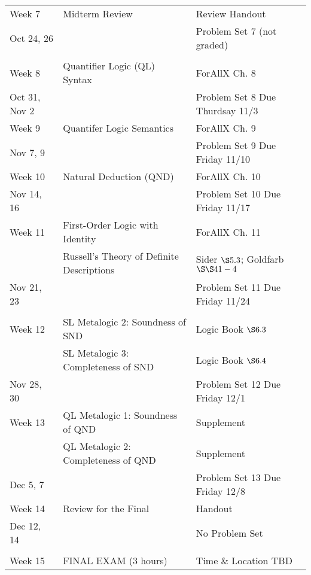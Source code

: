 \documentclass[letterpaper]{inzane_syllabus} %
\begin{document}
\begin{center}
\begin{tabularx}{\textwidth}{p{2.5cm}p{8cm}p{9cm}}
Week 7 & Midterm Review & Review Handout \\
Oct 24, 26 & &  Problem Set 7 (not graded) \\
\arrayrulecolor{myCOLOR}\hline

\multicolumn{2}{l}{\textbf{\textcolor{myCOLOR}{\large Part 2: Quantifer Logic (QL) }}} \\
\hline

Week 8 & Quantifier Logic (QL) Syntax & ForAllX Ch. 8 \\
Oct 31, Nov 2 & & Problem Set 8 Due Thurdsay 11/3 \\
\arrayrulecolor{maingray}\hline
 
Week 9 & Quantifer Logic Semantics & ForAllX Ch. 9 \\
Nov 7, 9 & & Problem Set 9 Due Friday 11/10 \\
\arrayrulecolor{maingray}\hline

Week 10 & Natural Deduction (QND) & ForAllX Ch. 10 \\
Nov 14, 16 & & Problem Set 10 Due Friday 11/17 \\
\arrayrulecolor{maingray}\hline

Week 11 & First-Order Logic with Identity & ForAllX Ch. 11 \\
& Russell's Theory of Definite Descriptions & Sider $\S 5.3$; Goldfarb $\S\S 41-4$ \\
Nov 21, 23 & & Problem Set 11 Due Friday 11/24 \\
\arrayrulecolor{maingray}\hline

\multicolumn{2}{l}{\textbf{\textcolor{myCOLOR}{\large Part 3: Metalogic }}} \\
\hline

Week 12 & SL Metalogic 2: Soundness of SND & Logic Book $\S6.3$ \\
& SL Metalogic 3: Completeness of SND & Logic Book $\S6.4$ \\
Nov 28, 30 & & Problem Set 12 Due Friday 12/1 \\
\arrayrulecolor{maingray}\hline

Week 13 & QL Metalogic 1: Soundness of QND & Supplement \\
& QL Metalogic 2: Completeness of QND & Supplement \\
Dec 5, 7 & & Problem Set 13 Due Friday 12/8 \\
\arrayrulecolor{maingray}\hline

Week 14 & Review for the Final & Handout \\
Dec 12, 14 & & No Problem Set \\

\arrayrulecolor{maingray}\hline\\

\arrayrulecolor{myCOLOR}\hline
Week 15 & FINAL EXAM (3 hours) & Time \& Location TBD \\ 
\hline 
\end{tabularx}
\end{center}


\end{document}
